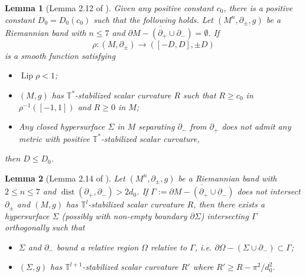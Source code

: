 \documentclass[10pt,a4paper]{amsart}
\newtheorem{lemma}{Lemma}
\DeclareMathOperator{\Lip}{Lip}
\newcommand{\de}{\partial}
\DeclareMathOperator{\dist}{dist}
\begin{document}
\begin{lemma}[Lemma 2.12 of \cite{SWWZ24}]\label{Lem: D estimate}
Given any positive constant $c_0$, there is a positive constant $D_{0}=D_0(c_0)$ such that the following holds.
Let $(M^{n},\partial_\pm,g)$ be a Riemannian band with $n\leq7$ and $\overline{\partial M-(\partial_+\cup\partial_-)}=\emptyset$. If
\[
\rho: (M,\de_{\pm}) \to ([-D,D],\pm D)
\]
is a smooth function satisfying
\begin{itemize}\setlength{\itemsep}{1mm}
\item $\Lip\rho<1$;
\item $(M,g)$ has $\mathbb T^*$-stabilized scalar curvature $R$ such that $R\geq c_{0}$ in $\rho^{-1}([-1,1])$ and $R\geq0$ in $M$;
\item Any closed hypersurface $\Sigma$ in $M$ separating $\de_{-}$ from $\de_{+}$ does not admit any metric with positive $\mathbb{T}^{*}$-stabilized scalar curvature,
\end{itemize}
then $D\leq D_{0}$.
\end{lemma}

\begin{lemma}[Lemma 2.14 of \cite{CCZ23}]\label{Lem: free boundary}
Let $(M^{n},\partial_\pm,g)$ be a Riemannian band with $2\leq n\leq 7$ and $\dist(\partial_+,\partial_-)>2d_0$. If $\Gamma:=\overline{\partial M-(\partial_+\cup\partial_-)}$ does not intersect $\de_{\pm}$ and $(M,g)$ has $\mathbb T^l$-stabilized scalar curvature $R$, then there exists a hypersurface $\Sigma$ (possibly with non-empty boundary $\partial\Sigma$) intersecting $\Gamma$ orthogonally such that
\begin{itemize}\setlength{\itemsep}{1mm}
\item $\Sigma$ and $\partial_-$ bound a relative region $\Omega$ relative to $\Gamma$, i.e. $\partial\Omega-(\Sigma\cup \partial_-)\subset \Gamma$;
\item $(\Sigma,g)$ has $\mathbb T^{l+1}$-stabilized scalar curvature $R'$ where $R'\geq R-\pi^2/d_0^2$.
\end{itemize}
\end{lemma}
\end{document}
